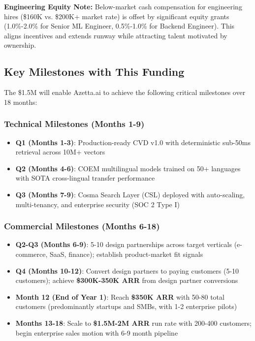 \textbf{Engineering Equity Note:} Below-market cash compensation for engineering hires (\$160K vs. \$200K+ market rate) is offset by significant equity grants (1.0\%-2.0\% for Senior ML Engineer, 0.5\%-1.0\% for Backend Engineer). This aligns incentives and extends runway while attracting talent motivated by ownership.

\subsection{Key Milestones with This Funding}

The \$1.5M will enable Azetta.ai to achieve the following critical milestones over 18 months:

\subsubsection{Technical Milestones (Months 1-9)}

\begin{itemize}[noitemsep]
    \item \textbf{Q1 (Months 1-3)}: Production-ready CVD v1.0 with deterministic sub-50ms retrieval across 10M+ vectors
    
    \item \textbf{Q2 (Months 4-6)}: COEM multilingual models trained on 50+ languages with SOTA cross-lingual transfer performance
    
    \item \textbf{Q3 (Months 7-9)}: Cosma Search Layer (CSL) deployed with auto-scaling, multi-tenancy, and enterprise security (SOC 2 Type I)
\end{itemize}

\subsubsection{Commercial Milestones (Months 6-18)}

\begin{itemize}[noitemsep]
    \item \textbf{Q2-Q3 (Months 6-9)}: 5-10 design partnerships across target verticals (e-commerce, SaaS, finance); establish product-market fit signals
    
    \item \textbf{Q4 (Months 10-12)}: Convert design partners to paying customers (5-10 customers); achieve \textbf{\$300K-350K ARR} from design partner conversions
    
    \item \textbf{Month 12 (End of Year 1)}: Reach \textbf{\$350K ARR} with 50-80 total customers (predominantly startups and SMBs, with 1-2 enterprise pilots)
    
    \item \textbf{Months 13-18}: Scale to \textbf{\$1.5M-2M ARR} run rate with 200-400 customers; begin enterprise sales motion with 6-9 month pipeline
\end{itemize}

